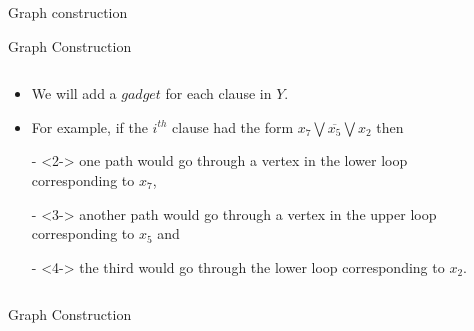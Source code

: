 \documentclass[xcolor=dvipsnames]{beamer}
\begin{document}
\begin{section}{Graph construction }
\begin{frame}{Graph Construction}
\begin{columns}
\begin{column}{0.45\textwidth}
\begin{itemize}
\item<1-> We will add a $gadget$ for each clause in $Y$.
\item<1-> For example, if the $i^{th}$ clause had the form $x_7 \bigvee \overline{x_5} \bigvee x_2$ then
\item[-]<2-> one path would go through a vertex in the lower loop corresponding
to $x_7$, 
\item[-]<3-> another path would go through a vertex in the upper loop corresponding to $x_5$ and 
\item[-]<4-> the third would go through the lower loop corresponding to $x_2$.
\end{itemize}
\end{column}
\begin{column}{0.55\textwidth}
    \begin{overlayarea}{0.55\textwidth}{8cm}
        \only<1>{}
        \only<2>{}
        \only<3>{}
    \end{overlayarea}
\end{column}
\end{columns}
\end{frame}


\begin{frame}{Graph Construction}
\begin{columns}
\begin{column}{0.45\textwidth}
    
\end{column}
\begin{column}{0.55\textwidth}
    \begin{overlayarea}{0.55\textwidth}{8cm}
    \end{overlayarea}
\end{column}
\end{columns}
\end{frame}


\end{section}
\end{document}
